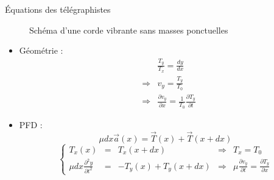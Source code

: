 \documentclass[xcolor=x11names,compress]{beamer}
\renewcommand{\(}{\begin{columns}}
\renewcommand{\)}{\end{columns}}
\newcommand{\<}[1]{\begin{column}{#1}}
\renewcommand{\>}{\end{column}}
\begin{document}
\begin{frame}{Équations des télégraphistes}
	\begin{minipage}[t]{0.49\linewidth}
		\begin{figure}[!h]
			\caption*{\label{schema_corde} \scriptsize Schéma d'une corde vibrante sans masses ponctuelles}
		\end{figure}
	\end{minipage}
	\begin{minipage}[t]{0.49\linewidth}
		\begin{itemize}
			\item Géométrie :
			\begin{eqnarray*}
				&& \frac{T_y}{T_x} = \frac{dy}{dx} \\
				& \Rightarrow & v_y = \frac{T_y}{T_0} \\
				& \Rightarrow & \boxed{\frac{\partial v_y}{\partial x} = \frac{1}{T_0} \frac{\partial T_y}{\partial t}}
			\end{eqnarray*}
		\end{itemize}
	\end{minipage}
	\begin{itemize}
	\item PFD : 
	\begin{equation*}
		\mu dx \vec{a} (x) = \vec{T}(x) + \vec{T} (x+dx)
	\end{equation*}
	\begin{equation*}
		\left\{\begin{array}{lclcl}
			T_x (x)&=& T_x (x+dx)  &\Rightarrow &  T_x = T_0 \\
			\mu dx \frac{\partial ^2 y}{\partial t^2} &=& -T_y (x) + T_y (x+dx) &\Rightarrow &  \boxed{\mu \frac{\partial v_y}{\partial t} = \frac{\partial T_y}{\partial x}}
		\end{array}\right.
	\end{equation*}	 
\end{itemize}
\end{frame}
\end{document}

